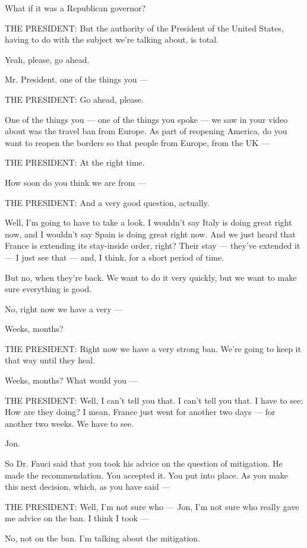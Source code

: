 What if it was a Republican governor?

THE PRESIDENT: But the authority of the President of the United States,
having to do with the subject we're talking about, is total.

Yeah, please, go ahead.

Mr. President, one of the things you ---

THE PRESIDENT: Go ahead, please.

One of the things you --- one of the things you spoke --- we saw in your
video about was the travel ban from Europe. As part of reopening
America, do you want to reopen the borders so that people from Europe,
from the UK ---

THE PRESIDENT: At the right time.

How soon do you think we are from ---

THE PRESIDENT: And a very good question, actually.

Well, I'm going to have to take a look. I wouldn't say Italy is doing
great right now, and I wouldn't say Spain is doing great right now. And
we just heard that France is extending its stay-inside order, right?
Their stay --- they've extended it --- I just see that --- and, I think,
for a short period of time.

But no, when they're back. We want to do it very quickly, but we want to
make sure everything is good.

No, right now we have a very ---

Weeks, months?

THE PRESIDENT: Right now we have a very strong ban. We're going to keep
it that way until they heal.

Weeks, months? What would you ---

THE PRESIDENT: Well, I can't tell you that. I can't tell you that. I
have to see: How are they doing? I mean, France just went for another
two days --- for another two weeks. We have to see.

Jon.

So Dr. Fauci said that you took his advice on the question of
mitigation. He made the recommendation. You accepted it. You put into
place. As you make this next decision, which, as you have said ---

THE PRESIDENT: Well, I'm not sure who --- Jon, I'm not sure who really
gave me advice on the ban. I think I took ---

No, not on the ban. I'm talking about the mitigation.

